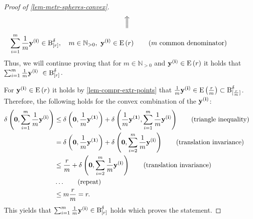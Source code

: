 \begin{proof}[Proof of \cref{lem-metr-spheres-convex}]
\begin{align*}
		 & \centerline{$\Big \Uparrow$}                                                                                               \\[1ex]
		 & \sum_{i=1}^{m} \frac{1}{m} \yy \in \cball{\dis}, \quad m \in \mathbb{N}_{> 0}, ~ \yy \in \E \tag{$m$ common denominator}
	\end{align*}
	Thus, we will continue proving that for $m \in \mathbb{N}_{>0}$ and $\yy \in \E$ it holds that $\sum_{i=1}^{m} \frac{1}{m} \yy ~ \in \cball{\dis}$.

	For $\yy \in \E$ it holds by \cref{lem-compr-extr-points} that $\frac{1}{m}\yy \in \E[\frac{\dis}{m}] \subset \cball{\frac{\dis}{m}}$.
	Therefore, the following holds for the convex combination of the $\yy$:
	\begin{align*}
    \metr{\ve{0}}{\sum_{i=1}^{m} \frac{1}{m} \yy} & \leq \metr{\ve{0}}{\frac{1}{m}\yy[1]} + \metr{\frac{1}{m} \yy[1]}{\sum_{i=1}^{m} \frac{1}{m}\yy} \tag{triangle inequality} \\
		                                         & = \metr{\ve{0}}{\frac{1}{m}\yy[1]} + \metr{\ve{0}}{\sum_{i=2}^{m} \frac{1}{m}\yy} \tag{translation invariance}           \\
		                                         & \leq \frac{\dis}{m} + \metr{\ve{0}}{\sum_{i=2}^{m} \frac{1}{m}\yy} \tag{translation invariance}                   \\
		                                         & \dots \tag{repeat}                                                                                             \\
		                                         & \leq m \frac{\dis}{m} = \dis.
	\end{align*}
	This yields that $\sum_{i=1}^{m} \frac{1}{m}\yy \in \cball{\dis}$ holds which proves the statement.
\end{proof}
